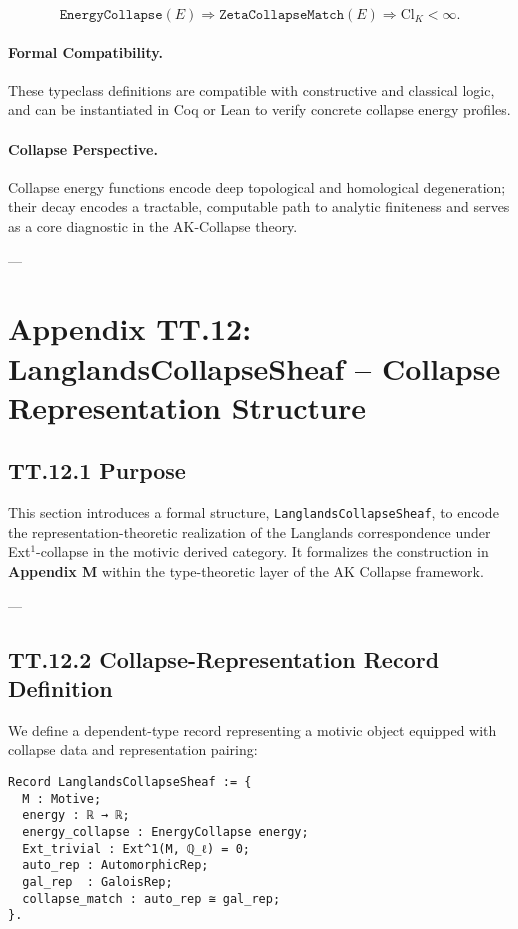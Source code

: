 \documentclass[11pt]{article}
\begin{document}
\[
\texttt{EnergyCollapse}(E) \Rightarrow \texttt{ZetaCollapseMatch}(E) \Rightarrow \mathrm{Cl}_K < \infty.
\]

\paragraph{Formal Compatibility.}
These typeclass definitions are compatible with constructive and classical logic,  
and can be instantiated in Coq or Lean to verify concrete collapse energy profiles.

\paragraph{Collapse Perspective.}
Collapse energy functions encode deep topological and homological degeneration;  
their decay encodes a tractable, computable path to analytic finiteness and  
serves as a core diagnostic in the AK-Collapse theory.

---

\section*{Appendix TT.12: LanglandsCollapseSheaf – Collapse Representation Structure}

\subsection*{TT.12.1 Purpose}

This section introduces a formal structure, \texttt{LanglandsCollapseSheaf},  
to encode the representation-theoretic realization of the Langlands correspondence  
under Ext$^1$-collapse in the motivic derived category.  
It formalizes the construction in \textbf{Appendix M} within the type-theoretic layer of the AK Collapse framework.

---

\subsection*{TT.12.2 Collapse-Representation Record Definition}

We define a dependent-type record representing a motivic object equipped with collapse data and representation pairing:

\begin{verbatim}
Record LanglandsCollapseSheaf := {
  M : Motive;
  energy : ℝ → ℝ;
  energy_collapse : EnergyCollapse energy;
  Ext_trivial : Ext^1(M, ℚ_ℓ) = 0;
  auto_rep : AutomorphicRep;
  gal_rep  : GaloisRep;
  collapse_match : auto_rep ≅ gal_rep;
}.
\end{verbatim}
\end{document}

